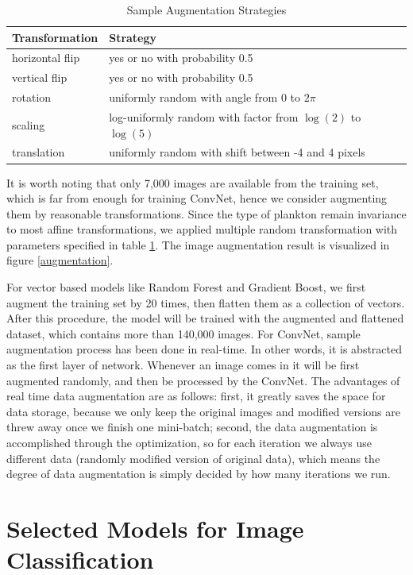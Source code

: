 \documentclass[11pt,oneside,a4paper]{article}
\numberwithin{equation}{section}
\begin{document}
\begin{table}[ht!]
\centering
\small
\caption{Sample Augmentation Strategies}
\begin{tabular}{ll}
 \toprule
 Transformation & Strategy\\
 \midrule
 horizontal flip & yes or no with probability 0.5\\
 vertical flip & yes or no with probability 0.5 \\
 rotation & uniformly random with angle from 0 to $2\pi$ \\
 scaling & log-uniformly random with factor from $\log(2)$ to $\log(5)$\\
 translation & uniformly random with shift between -4 and 4 pixels \\
\bottomrule
\end{tabular}
\label{tab:trans}
\end{table}

It is worth noting that only 7,000 images are available from the training set, which is far from enough for training ConvNet, hence we consider augmenting them by reasonable transformations. Since the type of plankton remain invariance to most affine transformations, we applied multiple random transformation with parameters specified in table \ref{tab:trans}. The image augmentation result is visualized in figure \ref{augmentation}.

For vector based models like Random Forest and Gradient Boost, we first augment the training set by 20 times, then flatten them as a collection of vectors. After this procedure, the model will be trained with the augmented and flattened dataset, which contains more than 140,000 images. For ConvNet, sample augmentation process has been done in real-time. In other words, it is abstracted as the first layer of network. Whenever an image comes in it will be first augmented randomly, and then be processed by the ConvNet. The advantages of real time data augmentation are as follows: first, it greatly saves the space for data storage, because we only keep the original images and modified versions are threw away once we finish one mini-batch; second, the data augmentation is accomplished through the optimization, so for each iteration we always use different data (randomly modified version of original data), which means the degree of data augmentation is simply decided by how many iterations we run.

\section{Selected Models for Image Classification}
\end{document}
